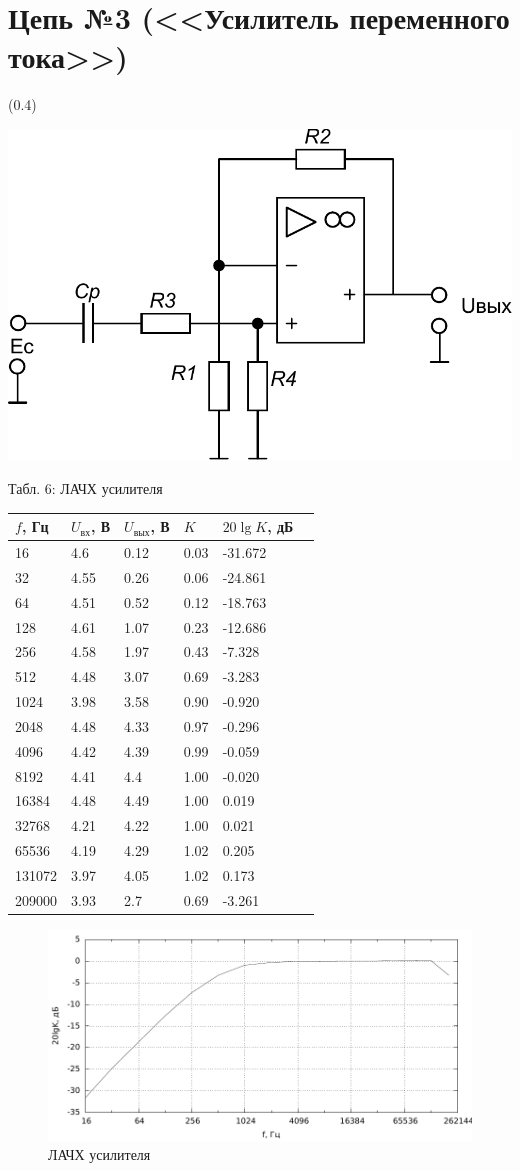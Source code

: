 \section{Цепь №3 (<<Усилитель переменного тока>>)}
\sidefig(0.4\textwidth){\includegraphics[scale=0.55]{Circ3.pdf}
\caption{Схема}}
{Табл. 6: ЛАЧХ усилителя

\begin{tabular}{|l|l|l|l|l|l|}
\hline
$f$, Гц & $U_{вх}$, В & $U_{вых}$, В & $K$ & $20\lg K$, дБ \\
\hline
16&4.6&0.12&0.03&-31.672\\
\hline
32&4.55&0.26&0.06&-24.861\\
\hline
64&4.51&0.52&0.12&-18.763\\
\hline
128&4.61&1.07&0.23&-12.686\\
\hline
256&4.58&1.97&0.43&-7.328\\
\hline
512&4.48&3.07&0.69&-3.283\\
\hline
1024&3.98&3.58&0.90&-0.920\\
\hline
2048&4.48&4.33&0.97&-0.296\\
\hline
4096&4.42&4.39&0.99&-0.059\\
\hline
8192&4.41&4.4&1.00&-0.020\\
\hline
16384&4.48&4.49&1.00&0.019\\
\hline
32768&4.21&4.22&1.00&0.021\\
\hline
65536&4.19&4.29&1.02&0.205\\
\hline
131072&3.97&4.05&1.02&0.173\\
\hline
209000&3.93&2.7&0.69&-3.261\\
\hline
\end{tabular}}

\begin{figure}[H]
\includegraphics[scale=1]{6.pdf}
\caption{ЛАЧХ усилителя}
\end{figure}